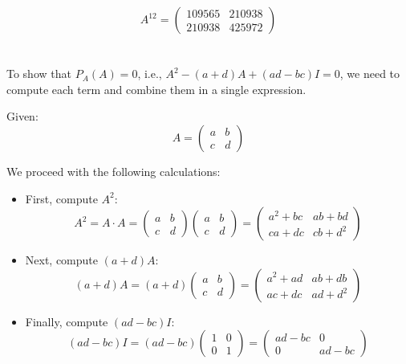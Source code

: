 \documentclass{article}
\begin{document}
\[
    A^{12} = \begin{pmatrix} 109565 & 210938 \\ 210938 & 425972 \end{pmatrix}
\]

\section{}

To show that \( P_A(A) = 0 \), i.e., \( A^2 - (a+d)A + (ad - bc)I = 0 \), we need to compute each term and combine them in a single expression.

Given:
\[
    A = \begin{pmatrix} a & b \\ c & d \end{pmatrix}
\]

We proceed with the following calculations:

\begin{itemize}
    \item First, compute \( A^2 \):
          \[
              A^2 = A \cdot A = \begin{pmatrix} a & b \\ c & d \end{pmatrix} \begin{pmatrix} a & b \\ c & d \end{pmatrix} = \begin{pmatrix} a^2 + bc & ab + bd \\ ca + dc & cb + d^2 \end{pmatrix}
          \]

    \item Next, compute \( (a + d)A \):
          \[
              (a + d)A = (a + d) \begin{pmatrix} a & b \\ c & d \end{pmatrix} = \begin{pmatrix} a^2 + ad & ab + db \\ ac + dc & ad + d^2 \end{pmatrix}
          \]

    \item Finally, compute \( (ad - bc)I \):
          \[
              (ad - bc)I = (ad - bc) \begin{pmatrix} 1 & 0 \\ 0 & 1 \end{pmatrix} = \begin{pmatrix} ad - bc & 0 \\ 0 & ad - bc \end{pmatrix}
          \]
\end{itemize}
\end{document}
